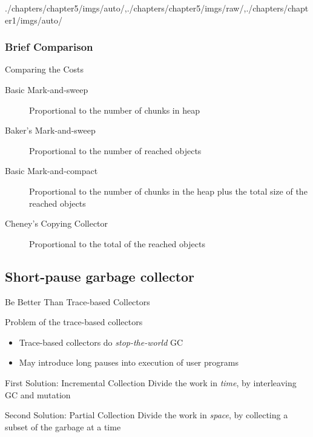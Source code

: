 \begin{graphicspathcontext}{{./chapters/chapter5/imgs/auto/},{./chapters/chapter5/imgs/raw/},{./chapters/chapter1/imgs/auto/}}
\begin{bibunit}[apalike]
\subsubsection{Brief Comparison}
\subsubsectiontableofcontentslide
\resetsectionsintoc

\begin{frame}[background=8]{Comparing the Costs}
	\begin{description}
		\item[Basic Mark-and-sweep] Proportional to the number of chunks in heap
		\vfill
		\item[Baker's Mark-and-sweep] Proportional to the number of reached objects
		\vfill
		\item[Basic Mark-and-compact] Proportional to the number of chunks in the heap plus the total size of the reached objects
		\vfill
		\item[Cheney's Copying Collector] Proportional to the total of the reached objects
	\end{description}
\end{frame}

\subsection{Short-pause garbage collector}
\subsectiontableofcontentslide

\begin{frame}{{Be Better Than} Trace-based Collectors}
	\begin{alertblock}{Problem of the trace-based collectors}
		\begin{itemize}
			\item Trace-based collectors do \emph{stop-the-world} GC
			\item May introduce long pauses into execution of user programs
		\end{itemize}
	\end{alertblock}
	\vspace{.5cm}
	\begin{block}{First Solution: Incremental Collection}
		Divide the work in \emph{time}, by interleaving GC and mutation
	\end{block}
	\vspace{.5cm}
	\begin{block}{Second Solution: Partial Collection}
		Divide the work in \emph{space}, by collecting a subset of the garbage at a time
	\end{block}
\end{frame}


\end{bibunit}
\end{graphicspathcontext}

